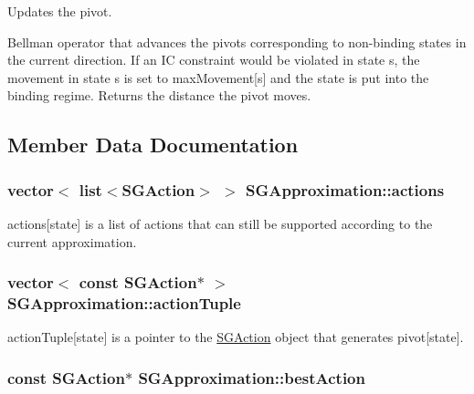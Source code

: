 Updates the pivot. 

Bellman operator that advances the pivots corresponding to non-\/binding states in the current direction. If an I\+C constraint would be violated in state s, the movement in state s is set to max\+Movement\mbox{[}s\mbox{]} and the state is put into the binding regime. Returns the distance the pivot moves. 

\subsection{Member Data Documentation}
\hypertarget{class_s_g_approximation_abd29fc968e004b53a2d59702657a2b70}{
\subsubsection[{actions}]{\setlength{\rightskip}{0pt plus 5cm}vector$<$ list$<${\bf S\+G\+Action}$>$ $>$ S\+G\+Approximation\+::actions\hspace{0.3cm}{\ttfamily [private]}}}\label{class_s_g_approximation_abd29fc968e004b53a2d59702657a2b70}
actions\mbox{[}state\mbox{]} is a list of actions that can still be supported according to the current approximation. \hypertarget{class_s_g_approximation_a70b2b3ee6577efd50e7cbe49b464f232}{
\subsubsection[{action\+Tuple}]{\setlength{\rightskip}{0pt plus 5cm}vector$<$ const {\bf S\+G\+Action}$\ast$ $>$ S\+G\+Approximation\+::action\+Tuple\hspace{0.3cm}{\ttfamily [private]}}}\label{class_s_g_approximation_a70b2b3ee6577efd50e7cbe49b464f232}
action\+Tuple\mbox{[}state\mbox{]} is a pointer to the \hyperlink{class_s_g_action}{S\+G\+Action} object that generates pivot\mbox{[}state\mbox{]}. \hypertarget{class_s_g_approximation_ab2a6d6ed6880fb4cbc05e671b6b6673a}{
\subsubsection[{best\+Action}]{\setlength{\rightskip}{0pt plus 5cm}const {\bf S\+G\+Action}$\ast$ S\+G\+Approximation\+::best\+Action\hspace{0.3cm}{\ttfamily [private]}}}\label{class_s_g_approximation_ab2a6d6ed6880fb4cbc05e671b6b6673a}

